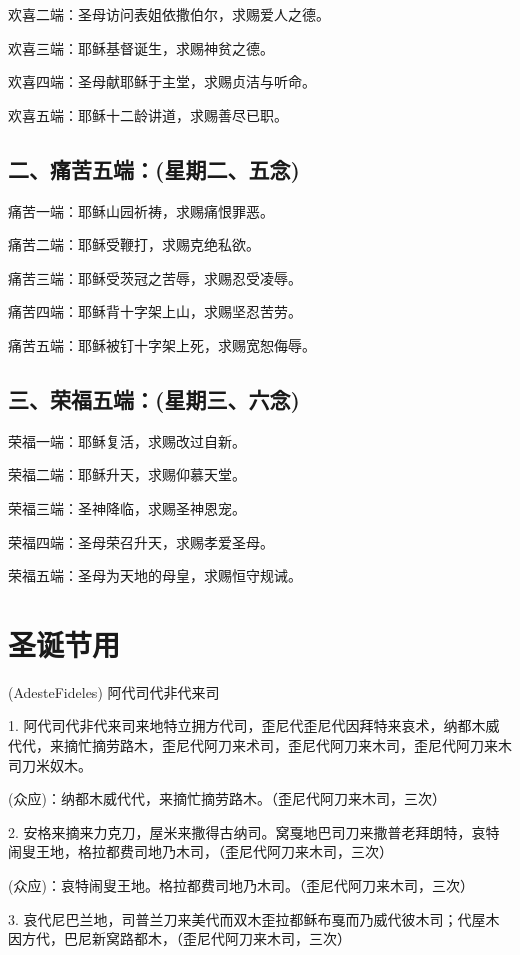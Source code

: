 \documentclass[UTF8,17pt]{ctexart}
\begin{document}
欢喜⼆端：圣母访问表姐依撒伯尔，求赐爱⼈之德。

欢喜三端：耶稣基督诞⽣，求赐神贫之德。

欢喜四端：圣母献耶稣于主堂，求赐贞洁与听命。

欢喜五端：耶稣⼗⼆龄讲道，求赐善尽已职。

\subsection{二、痛苦五端：(星期二、五念)}

痛苦⼀端：耶稣⼭园祈祷，求赐痛恨罪恶。

痛苦⼆端：耶稣受鞭打，求赐克绝私欲。

痛苦三端：耶稣受茨冠之苦辱，求赐忍受凌辱。

痛苦四端：耶稣背⼗字架上⼭，求赐坚忍苦劳。

痛苦五端：耶稣被钉⼗字架上死，求赐宽恕侮辱。

\subsection{三、荣福五端：(星期三、六念)}

荣福⼀端：耶稣复活，求赐改过⾃新。

荣福⼆端：耶稣升天，求赐仰慕天堂。

荣福三端：圣神降临，求赐圣神恩宠。

荣福四端：圣母荣召升天，求赐孝爱圣母。

荣福五端：圣母为天地的母皇，求赐恒守规诫。

\section{圣诞节⽤}

(AdesteFideles) 阿代司代⾮代来司

1. 阿代司代⾮代来司来地特⽴拥⽅代司，歪尼代歪尼代因拜特来哀术，纳都⽊威代代，来摘忙摘劳路⽊，歪尼代阿⼑来术司，歪尼代阿⼑来⽊司，歪尼代阿⼑来⽊司⼑⽶奴⽊。

(众应)：纳都⽊威代代，来摘忙摘劳路⽊。（歪尼代阿⼑来⽊司，三次）

2. 安格来摘来⼒克⼑，屋⽶来撒得古纳司。窝戛地巴司⼑来撒普⽼拜朗特，哀特闹叟王地，格拉都费司地乃⽊司，（歪尼代阿⼑来⽊司，三次）

(众应)：哀特闹叟王地。格拉都费司地乃⽊司。（歪尼代阿⼑来⽊司，三次）

3. 哀代尼巴兰地，司普兰⼑来美代⽽双⽊歪拉都稣布戛⽽乃威代彼⽊司；代屋⽊因⽅代，巴尼新窝路都⽊，（歪尼代阿⼑来⽊司，三次）
\end{document}
